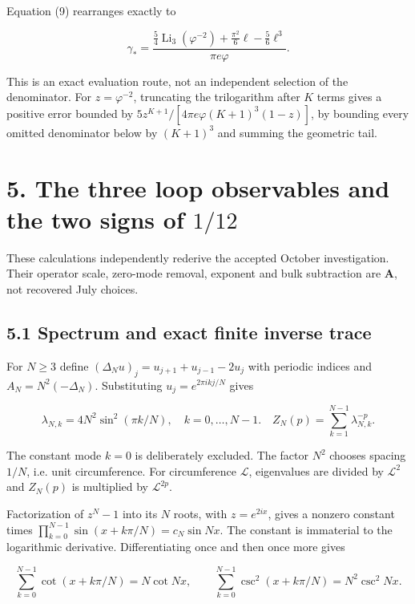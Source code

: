 \documentclass[11pt,a4paper]{article}
\begin{document}
Equation (9) rearranges exactly to


\[
\gamma_*=\frac{\tfrac54\operatorname{Li}_3(\varphi^{-2})
+\tfrac{\pi^2}{6}\ell-\tfrac56\ell^3}{\pi e\varphi}. \tag{12}
\]

This is an exact evaluation route, not an independent selection of the denominator. For $z=\varphi^{-2}$, truncating the trilogarithm after $K$ terms gives a positive error bounded by
$5z^{K+1}/[4\pi e\varphi(K+1)^3(1-z)]$, by bounding every omitted denominator below by $(K+1)^3$ and summing the geometric tail.


\clearpage
\section*{5. The three loop observables and the two signs of $1/12$}

These calculations independently rederive the accepted October investigation. Their operator scale, zero-mode removal, exponent and bulk subtraction are \textbf{A}, not recovered July choices.


\subsection*{5.1 Spectrum and exact finite inverse trace}

For $N\geq3$ define $(\Delta_Nu)_j=u_{j+1}+u_{j-1}-2u_j$ with periodic indices and $A_N=N^2(-\Delta_N)$. Substituting $u_j=e^{2\pi ikj/N}$ gives


\[
\lambda_{N,k}=4N^2\sin^2(\pi k/N),\quad k=0,\ldots,N-1.
\quad Z_N(p)=\sum_{k=1}^{N-1}\lambda_{N,k}^{-p}. \tag{13}
\]

The constant mode $k=0$ is deliberately excluded. The factor $N^2$ chooses spacing $1/N$, i.e. unit circumference. For circumference $\mathcal L$, eigenvalues are divided by $\mathcal L^2$ and $Z_N(p)$ is multiplied by $\mathcal L^{2p}$.


Factorization of $z^N-1$ into its $N$ roots, with $z=e^{2ix}$, gives a nonzero constant times
$\prod_{k=0}^{N-1}\sin(x+k\pi/N)=c_N\sin Nx$.
The constant is immaterial to the logarithmic derivative. Differentiating once and then once more gives


\[
\sum_{k=0}^{N-1}\cot(x+k\pi/N)=N\cot Nx,\qquad
\sum_{k=0}^{N-1}\csc^2(x+k\pi/N)=N^2\csc^2 Nx. \tag{14}
\]
\end{document}
